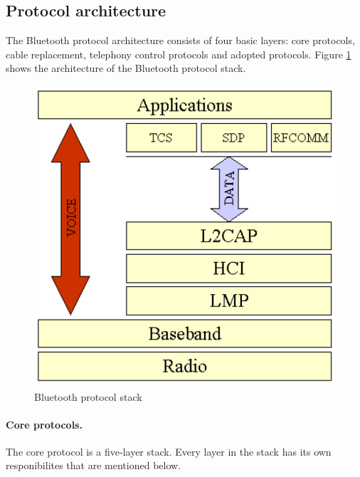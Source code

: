 \documentclass[a4paper, 11pt]{report}
\begin{document}
	\subsection{Protocol architecture}
The Bluetooth protocol architecture consists of four basic layers: core protocols, cable replacement, telephony control protocols and adopted protocols. Figure \ref{fig:bluetoothStack} shows the architecture of the Bluetooth protocol stack.
	\begin{figure}[h]
		\centering
		\includegraphics[scale=0.5]{images/bluetoothStack.pdf}
		\caption{Bluetooth protocol stack}\label{fig:bluetoothStack}
	\end{figure}


		\paragraph{Core protocols.}
The core protocol is a five-layer stack. Every layer in the stack has its own responibilites that are mentioned below.
\end{document}
